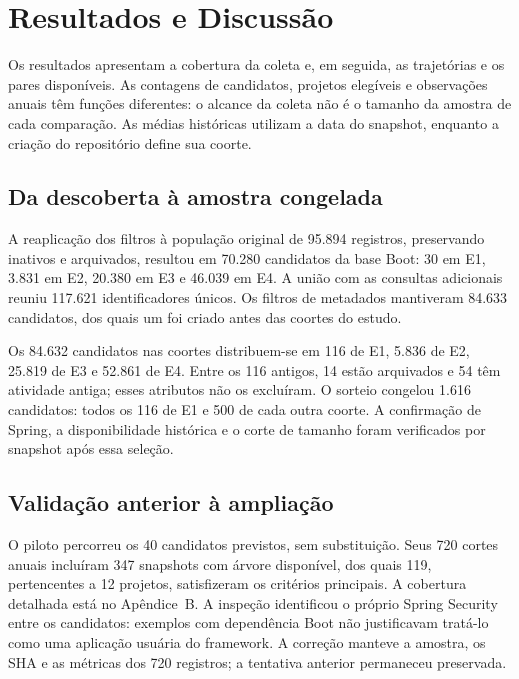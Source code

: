 \section{Resultados e Discussão}
\label{sec:resultados}

Os resultados apresentam a cobertura da coleta e, em seguida, as trajetórias e os pares disponíveis. As contagens de candidatos, projetos elegíveis e observações anuais têm funções diferentes: o alcance da coleta não é o tamanho da amostra de cada comparação. As médias históricas utilizam a data do snapshot, enquanto a criação do repositório define sua coorte.

\subsection{Da descoberta à amostra congelada}

A reaplicação dos filtros à população original de 95.894 registros, preservando inativos e arquivados, resultou em 70.280 candidatos da base Boot: 30 em E1, 3.831 em E2, 20.380 em E3 e 46.039 em E4. A união com as consultas adicionais reuniu 117.621 identificadores únicos. Os filtros de metadados mantiveram 84.633 candidatos, dos quais um foi criado antes das coortes do estudo.

Os 84.632 candidatos nas coortes distribuem-se em 116 de E1, 5.836 de E2, 25.819 de E3 e 52.861 de E4. Entre os 116 antigos, 14 estão arquivados e 54 têm atividade antiga; esses atributos não os excluíram. O sorteio congelou 1.616 candidatos: todos os 116 de E1 e 500 de cada outra coorte. A confirmação de Spring, a disponibilidade histórica e o corte de tamanho foram verificados por snapshot após essa seleção.

\subsection{Validação anterior à ampliação}
\label{subsec:piloto-historico}

O piloto percorreu os 40 candidatos previstos, sem substituição. Seus 720 cortes anuais incluíram 347 snapshots com árvore disponível, dos quais 119, pertencentes a 12 projetos, satisfizeram os critérios principais. A cobertura detalhada está no Apêndice~B. A inspeção identificou o próprio Spring Security entre os candidatos: exemplos com dependência Boot não justificavam tratá-lo como uma aplicação usuária do framework. A correção manteve a amostra, os SHA e as métricas dos 720 registros; a tentativa anterior permaneceu preservada.


